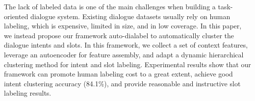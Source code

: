 The lack of labeled data is one of the main challenges when building a task-oriented dialogue system. Existing dialogue datasets usually rely on human labeling, which is expensive, limited in size, and in low coverage. In this paper, we instead propose our framework auto-dialabel to automatically cluster the dialogue intents and slots. In this framework, we collect a set of context features, leverage an autoencoder for feature assembly, and adapt a dynamic hierarchical clustering method for intent and slot labeling. Experimental results show that our framework can promote human labeling cost to a great extent, achieve good intent clustering accuracy (84.1\%), and provide reasonable and instructive slot labeling results.
